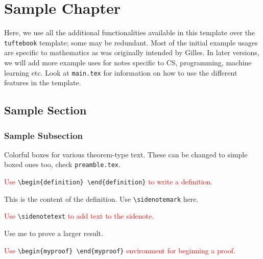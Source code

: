 \setcounter{chapter}{0}
\chapter{Sample Chapter}
\label{chap:sample-chapter} %

Here, we use all the additional functionalities available in this template over the \verb|tuftebook| template; some may be redundant. Most of the initial example usages are specific to mathematics as was originally intended by Gilles. In later versions, we will add more example uses for notes specific to CS, programming, machine learning etc. Look at \verb|main.tex| for information on how to use the different features in the template.


\section*{Sample Section}
\subsection*{Sample Subsection}

Colorful boxes for various theorem-type text. These can be changed to simple boxed ones too, check \verb|preamble.tex|.

\vspace{5mm}


\textcolor{red}{Use} \verb|\begin{definition} \end{definition}| \textcolor{red}{to write a definition.}

\begin{definition}
	This is the content of the definition. Use \verb|\sidenotemark| here.\sidenotemark
\end{definition}

\textcolor{red}{Use} \verb|\sidenotetext| \textcolor{red}{to add text to the sidenote.}


\begin{lemma}
	Use me to prove a larger result.
\end{lemma}

\textcolor{red}{Use} \verb|\begin{myproof} \end{myproof}| \textcolor{red}{environment for beginning a proof.}


